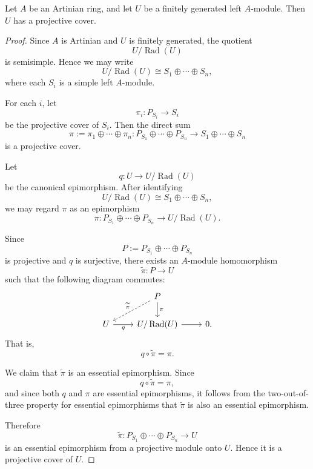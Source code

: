 \begin{corollary}\label{cor:fg-module-has-projective-cover}
    Let $A$ be an Artinian ring, and let $U$ be a finitely generated left $A$-module.
    Then $U$ has a projective cover.
\end{corollary}

\begin{proof}
    Since $A$ is Artinian and $U$ is finitely generated, the quotient
    \[
        U/\operatorname{Rad}(U)
    \]
    is semisimple. Hence we may write
    \[
        U/\operatorname{Rad}(U)\cong S_1\oplus\cdots\oplus S_n,
    \]
    where each $S_i$ is a simple left $A$-module.

    For each $i$, let
    \[
        \pi_i:P_{S_i}\longrightarrow S_i
    \]
    be the projective cover of $S_i$. Then the direct sum
    \[
        \pi:=\pi_1\oplus\cdots\oplus\pi_n:
        P_{S_1}\oplus\cdots\oplus P_{S_n}
        \longrightarrow
        S_1\oplus\cdots\oplus S_n
    \]
    is a projective cover.

    Let
    \[
        q:U\longrightarrow U/\operatorname{Rad}(U)
    \]
    be the canonical epimorphism. After identifying
    \[
        U/\operatorname{Rad}(U)\cong S_1\oplus\cdots\oplus S_n,
    \]
    we may regard $\pi$ as an epimorphism
    \[
        \pi:P_{S_1}\oplus\cdots\oplus P_{S_n}
        \longrightarrow
        U/\operatorname{Rad}(U).
    \]

    Since
    \[
        P:=P_{S_1}\oplus\cdots\oplus P_{S_n}
    \]
    is projective and $q$ is surjective, there exists an $A$-module homomorphism
    \[
        \widetilde{\pi}:P\longrightarrow U
    \]
    such that the following diagram commutes:
    \[
        \begin{tikzcd}
            & P \arrow[d, "\pi"] \arrow[dl, dashed, "\widetilde{\pi}"'] \\
            U \arrow[r, "q"'] & U/\operatorname{Rad}(U) \arrow[r] & 0 .
        \end{tikzcd}
    \]
    That is,
    \[
        q\circ \widetilde{\pi}=\pi.
    \]

    We claim that \(\widetilde{\pi}\) is an essential epimorphism. Since
    \[
        q\circ \widetilde{\pi}=\pi,
    \]
    and since both \(q\) and \(\pi\) are essential epimorphisms, it follows from the
    two-out-of-three property for essential epimorphisms that \(\widetilde{\pi}\) is also an
    essential epimorphism.
    
    Therefore
    \[
        \widetilde{\pi}:P_{S_1}\oplus\cdots\oplus P_{S_n}\longrightarrow U
    \]
    is an essential epimorphism from a projective module onto \(U\). Hence it is a
    projective cover of \(U\).
\end{proof}

